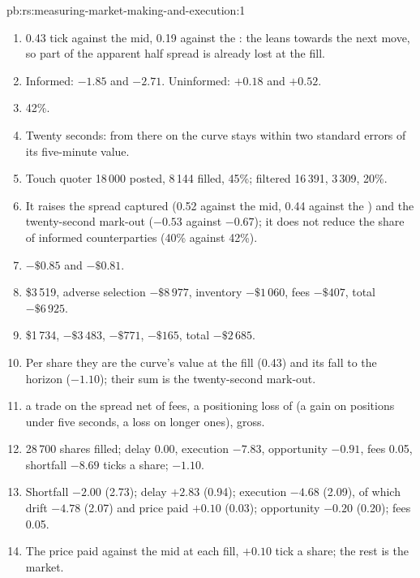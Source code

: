 \begin{solution}{pb:rs:measuring-market-making-and-execution:1}
\begin{enumerate}
\item 0.43 tick against the mid, 0.19 against the : the  leans towards the next move, so part of the apparent half spread is already lost at
the fill.
\item Informed: $-1.85$ and $-2.71$. Uninformed: $+0.18$ and $+0.52$.
\item 42\%.
\item Twenty seconds: from there on the curve stays within two standard errors of its five-minute value.
\item Touch quoter 18\,000 posted, 8\,144 filled, 45\%; filtered 16\,391, 3\,309, 20\%.
\item It raises the spread captured (0.52 against the mid, 0.44 against the ) and the twenty-second mark-out ($-0.53$ against $-0.67$); it does not reduce
the share of informed counterparties (40\% against 42\%).
\item $-\$0.85$ and $-\$0.81$.
\item {} \$3\,519, adverse selection $-\$8\,977$, inventory $-\$1\,060$, fees $-\$407$, total $-\$6\,925$.
\item \$1\,734, $-\$3\,483$, $-\$771$, $-\$165$, total $-\$2\,685$.
\item Per share they are the curve's value at the fill (0.43) and its fall to the horizon ($-1.10$); their sum is the twenty-second mark-out.
\item {} a trade on the spread net of fees, a positioning loss of  (a gain on positions under five seconds, a loss on longer ones), 
gross.
\item 28\,700 shares filled; delay 0.00, execution $-7.83$, opportunity $-0.91$, fees 0.05, shortfall $-8.69$ ticks a share;  $-1.10$.
\item Shortfall $-2.00$ (2.73); delay $+2.83$ (0.94); execution $-4.68$ (2.09), of which drift $-4.78$ (2.07) and price paid $+0.10$ (0.03); opportunity $-0.20$ (0.20);
fees 0.05.
\item The price paid against the mid at each fill, $+0.10$ tick a share; the rest is the market.

\end{enumerate}
\end{solution}
